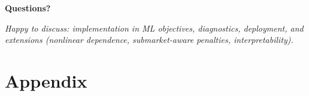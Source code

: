 \documentclass[aspectratio=169,12pt,]{beamer}
\newcommand{\1}{\mathbf{1}}
\begin{document}
\begin{frame}{}
\vfill
\begin{center}
{\Huge\textbf{Questions?}}
\end{center}
\vspace{3mm}
\begin{center}
\footnotesize\itshape
Happy to discuss: implementation in ML objectives, diagnostics, deployment, and extensions (nonlinear dependence, submarket-aware penalties, interpretability).
\end{center}
\vfill
\end{frame}


\appendix
\section*{Appendix}
\end{document}
